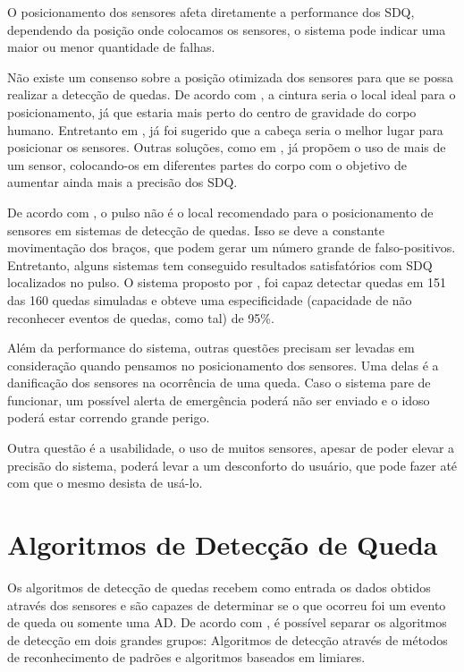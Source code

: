O posicionamento dos sensores afeta diretamente a performance dos \ac{SDQ}, dependendo da posição onde colocamos os sensores, o sistema pode indicar uma maior ou menor quantidade de falhas. 

Não existe um consenso sobre a posição otimizada dos sensores para que se possa realizar a detecção de quedas. De acordo com \cite{abbate2011recognition}, a cintura seria o local ideal para o posicionamento, já que estaria mais perto do centro de gravidade do corpo humano. Entretanto em \cite{kangas2007determination}, já foi sugerido que a cabeça seria o melhor lugar para posicionar os sensores. Outras soluções, como em \cite{gjoreski2011accelerometer}, já propõem o uso de mais de um sensor, colocando-os em diferentes partes do corpo com o objetivo de aumentar ainda mais a precisão dos \ac{SDQ}.


De acordo com \cite{casilari2015analysis}, o pulso não é o local recomendado para o posicionamento de sensores em sistemas de detecção de quedas. Isso se deve a constante movimentação dos braços, que podem gerar um número grande de falso-positivos. Entretanto, alguns sistemas tem conseguido resultados satisfatórios com \ac{SDQ} localizados no pulso. O sistema proposto por \cite{hsieh2014wrist}, foi capaz detectar quedas em 151 das 160 quedas simuladas e obteve uma especificidade (capacidade de não reconhecer eventos de quedas, como tal) de 95\%.

Além da performance do sistema, outras questões precisam ser levadas em consideração quando pensamos no posicionamento dos sensores. Uma delas é a danificação dos sensores na ocorrência de uma queda. Caso o sistema pare de funcionar, um possível alerta de emergência poderá não ser enviado e o idoso poderá estar correndo grande perigo. 

Outra questão é a usabilidade, o uso de muitos sensores, apesar de poder elevar a precisão do sistema, poderá levar a um desconforto do usuário, que pode fazer até com que o mesmo desista de usá-lo. 


\section{Algoritmos de Detecção de Queda}
\label{sec: FDS_algorithm}
Os algoritmos de detecção de quedas recebem como entrada os dados obtidos através dos sensores e são capazes de determinar se o que ocorreu foi um evento de queda ou somente uma \ac{AD}. De acordo com \cite{casilari2015analysis}, é possível separar os algoritmos de detecção em dois grandes grupos: Algoritmos de detecção através de métodos de reconhecimento de padrões e algoritmos baseados em limiares. 



